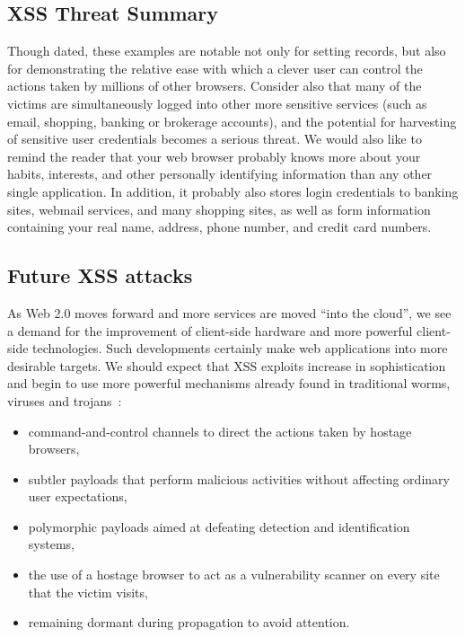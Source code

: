\documentclass{acmtrans2m}
\begin{document}
\subsection{XSS Threat Summary}
Though dated, these examples are notable not only for setting records, but also for demonstrating the relative ease with which a clever user can control the actions taken by millions of other browsers.
Consider also that many of the victims are simultaneously logged into other more sensitive services (such as email, shopping, banking or brokerage accounts), and the potential for harvesting of sensitive user credentials becomes a serious threat.
We would also like to remind the reader that your web browser probably knows more about your habits, interests, and other personally identifying information than any other single application.
In addition, it probably also stores login credentials to banking sites, webmail services, and many shopping sites, as well as form information containing your real name, address, phone number, and credit card numbers.


\subsection{Future XSS attacks}
As Web 2.0 moves forward and more services are moved ``into the cloud'', we see a demand for the improvement of client-side hardware and more powerful client-side technologies.
Such developments certainly make web applications into more desirable targets.
We should expect that XSS exploits increase in sophistication and begin to use more powerful mechanisms already found in traditional worms, viruses and trojans~\cite{xss-worms}:
\begin{itemize}
 \item command-and-control channels to direct the actions taken by hostage browsers,
 \item subtler payloads that perform malicious activities without affecting ordinary user expectations,
 \item polymorphic payloads aimed at defeating detection and identification systems,
 \item the use of a hostage browser to act as a vulnerability scanner on every site that the victim visits,
 \item remaining dormant during propagation to avoid attention.
\end{itemize}
\end{document}
